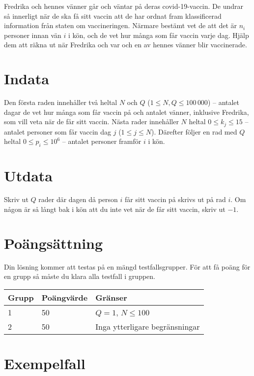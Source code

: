 
Fredrika och hennes vänner går och väntar på deras covid-19-vaccin. De undrar så innerligt när de ska få sitt vaccin att de har ordnat fram klassificerad information från staten om vaccineringen. Närmare bestämt vet de att det är $n_i$ personer innan vän $i$ i kön, och de vet hur många som får vaccin varje dag. Hjälp dem att räkna ut när Fredrika och var och en av hennes vänner blir vaccinerade. 

\section*{Indata}
Den första raden innehåller två heltal $N$ och $Q$ ($1 \le N,Q \le 100\,000$) --  antalet dagar de vet hur många som får vaccin på och antalet vänner, inklusive Fredrika, som vill veta när de får sitt vaccin. Nästa rader innehåller $N$ heltal $0 \le k_j \le 15$ -- antalet personer som får vaccin dag $j$ ($1 \le j \le N$). Därefter följer en rad med $Q$ heltal $0 \le p_i \le 10^6$ -- antalet personer framför $i$ i kön.

\section*{Utdata}
Skriv ut $Q$ rader där dagen då person $i$ får sitt vaccin på skrivs ut på rad $i$. Om någon är så långt bak i kön att du inte vet när de får sitt vaccin, skriv ut $-1$.
\section*{Poängsättning}
Din lösning kommer att testas på en mängd testfallsgrupper.
För att få poäng för en grupp så måste du klara alla testfall i gruppen.

\noindent
\begin{tabular}{| l | l | l |}
  \hline
  Grupp & Poängvärde & Gränser \\ \hline
  1 & 50 & $Q=1$, $N \le 100$ \\ \hline
  2 & 50 & Inga ytterligare begränsningar  \\ \hline
\end{tabular}

\section*{Exempelfall}
